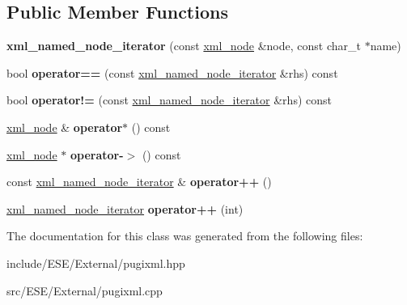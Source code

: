 \subsection*{Public Member Functions}
\begin{DoxyCompactItemize}
\item 
\hypertarget{classpugi_1_1xml__named__node__iterator_a900cdc6c175bcb56b1c66c7c05d2202f}{{\bfseries xml\-\_\-named\-\_\-node\-\_\-iterator} (const \hyperlink{classpugi_1_1xml__node}{xml\-\_\-node} \&node, const char\-\_\-t $\ast$name)}\label{classpugi_1_1xml__named__node__iterator_a900cdc6c175bcb56b1c66c7c05d2202f}

\item 
\hypertarget{classpugi_1_1xml__named__node__iterator_a49533305b71d21a160dda111a2ed9956}{bool {\bfseries operator==} (const \hyperlink{classpugi_1_1xml__named__node__iterator}{xml\-\_\-named\-\_\-node\-\_\-iterator} \&rhs) const }\label{classpugi_1_1xml__named__node__iterator_a49533305b71d21a160dda111a2ed9956}

\item 
\hypertarget{classpugi_1_1xml__named__node__iterator_a3f625995e15f1b5debecdb9fb618c9d9}{bool {\bfseries operator!=} (const \hyperlink{classpugi_1_1xml__named__node__iterator}{xml\-\_\-named\-\_\-node\-\_\-iterator} \&rhs) const }\label{classpugi_1_1xml__named__node__iterator_a3f625995e15f1b5debecdb9fb618c9d9}

\item 
\hypertarget{classpugi_1_1xml__named__node__iterator_a382a1fe2474c25b47d96dd901e3add8a}{\hyperlink{classpugi_1_1xml__node}{xml\-\_\-node} \& {\bfseries operator$\ast$} () const }\label{classpugi_1_1xml__named__node__iterator_a382a1fe2474c25b47d96dd901e3add8a}

\item 
\hypertarget{classpugi_1_1xml__named__node__iterator_a9fa4ca35803bfd50c61d369241a3da4a}{\hyperlink{classpugi_1_1xml__node}{xml\-\_\-node} $\ast$ {\bfseries operator-\/$>$} () const }\label{classpugi_1_1xml__named__node__iterator_a9fa4ca35803bfd50c61d369241a3da4a}

\item 
\hypertarget{classpugi_1_1xml__named__node__iterator_ae076ec9c8414c5444ce6e4db5052ccef}{const \hyperlink{classpugi_1_1xml__named__node__iterator}{xml\-\_\-named\-\_\-node\-\_\-iterator} \& {\bfseries operator++} ()}\label{classpugi_1_1xml__named__node__iterator_ae076ec9c8414c5444ce6e4db5052ccef}

\item 
\hypertarget{classpugi_1_1xml__named__node__iterator_a41e2afe0ee62a2d06d0694052277e1f9}{\hyperlink{classpugi_1_1xml__named__node__iterator}{xml\-\_\-named\-\_\-node\-\_\-iterator} {\bfseries operator++} (int)}\label{classpugi_1_1xml__named__node__iterator_a41e2afe0ee62a2d06d0694052277e1f9}

\end{DoxyCompactItemize}


The documentation for this class was generated from the following files\-:\begin{DoxyCompactItemize}
\item 
include/\-E\-S\-E/\-External/pugixml.\-hpp\item 
src/\-E\-S\-E/\-External/pugixml.\-cpp\end{DoxyCompactItemize}
